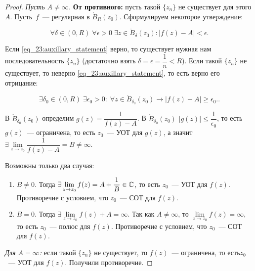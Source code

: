 \begin{proof}
\textit{Пусть \(A \ne \infty\).} \textbf{От противного:} пусть такой \(\{z_n\}\) не существует для
этого \(A\). Пусть~\(f\)~--- регулярная в \(\mathring{B}_R(z_0)\). Сформулируем некоторое
утверждение:

\begin{equation}
    \forall \delta \in (0, R) \; \forall \epsilon > 0 \; \exists z \in \mathring{B}_\delta(z_0)
    \colon |f(z) - A| < \epsilon. \tag{S} \label{eq_23:auxillary_statement}
\end{equation}

Если \ref{eq_23:auxillary_statement} верно, то существует нужная нам последовательность \(\{z_n\}\)
(достаточно взять \(\delta = \epsilon = \dfrac{1}{n} < R\)). Если такой \(\{z_n\}\) не существует,
то неверно \ref{eq_23:auxillary_statement}, то есть верно его отрицание:

\begin{equation}
    \exists \delta_0 \in (0, R) \; \exists \epsilon_0 > 0 \colon \; \forall z \in
    \mathring{B}_{\delta_0}(z_0) \to |f(z) - A| \ge \epsilon_0. \tag{S'}
    \label{eq_23:negation_auxillary_statement}.
\end{equation}

В \(\mathring{B}_{\delta_0}(z_0)\) определим \(g(z) = \dfrac{1}{f(z) - A}\). В
\(\mathring{B}_{\delta_0}(z_0)\) \(|g(z)| \le \dfrac{1}{\epsilon_0}\), то есть \(g(z)\)~---
ограничена, то есть \(z_0\)~--- УОТ для \(g(z)\), а значит \(\exists \lim\limits_{z \to z_0}
\dfrac{1}{f(z) - A} = B \ne \infty\).

Возможны только два случая:
\begin{enumerate}[wide=20pt, label=\arabic*., itemsep=0ex]
\item \(B \ne 0\). Тогда \(\exists \lim\limits_{z \to z_0} f(z) = A + \dfrac{1}{B} \in \mathbb{C}\), то
    есть \(z_0\)~--- УОТ для \(f(z)\). Противоречие с условием, что \(z_0\)~--- СОТ для \(f(z)\).
\item \(B = 0\). Тогда \(\exists \lim\limits_{z \to z_0} f(z) + A = \infty\). Так как \(A \ne
    \infty\), то \(\lim\limits_{z \to z_0} f(z) = \infty\), то
    есть \(z_0\)~--- полюс для \(f(z)\). Противоречие с условием, что \(z_0\)~--- СОТ для \(f(z)\).
\end{enumerate}

\textit{Для \(A = \infty\):} если такой \(\{z_n\}\) не существует, то \(f(z)\)~--- ограничена, то
есть\(z_0\)~--- УОТ для \(f(z)\). Получили противоречие.
\end{proof}

